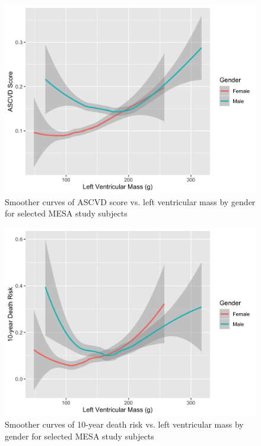 \documentclass [12pt, proquest] {uwthesis}[2016/11/22]
\begin{document}
\begin{figure}
    \centering
    \includegraphics[width = 6 in]{PlotA_5.png}
    \caption{Smoother curves of ASCVD score vs. left ventricular mass by gender for selected MESA study subjects}
\end{figure}

\begin{figure}
    \centering
    \includegraphics[width = 6 in]{PlotA_6.png}
    \caption{Smoother curves of 10-year death risk vs. left ventricular mass by gender for selected MESA study subjects}
\end{figure}
\end{document}
